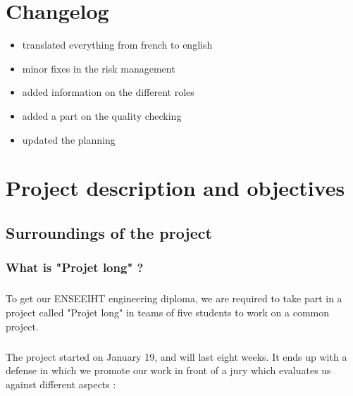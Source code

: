 \documentclass{report}
\begin{document}
\chapter*{Changelog}

\vspace{4mm}
\begin{itemize}
\item translated everything from french to english\vspace{1mm}
\item minor fixes in the risk management\vspace{1mm}
\item added information on the different roles\vspace{1mm}
\item added a part on the quality checking\vspace{1mm}
\item updated the planning\vspace{1mm}
\end{itemize}

\chapter{Project description and objectives}

\section{Surroundings of the project}

\subsection{What is "Projet long" ?}

\paragraph{}
\hspace{4mm}\textnormal{To get our ENSEEIHT engineering diploma, we are required to take part in 
a project called "Projet long" in teams of five students to work 
on a common project.}

\paragraph{}
\hspace{4mm}\textnormal{The project started on January 19, and will last eight weeks. It ends up with 
a defense in which we promote our work in front of a jury which evaluates 
us against different aspects :}
\end{document}

